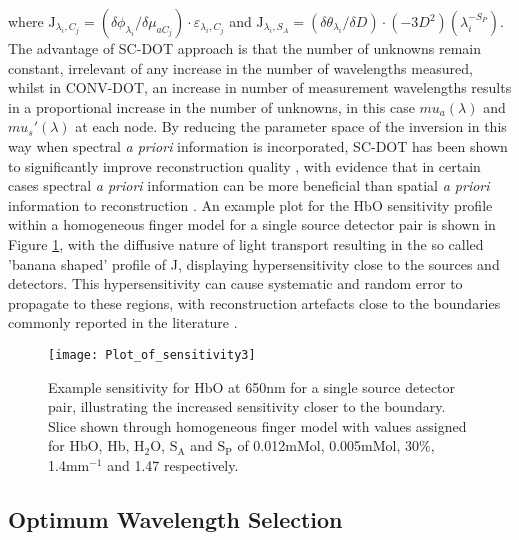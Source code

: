 \documentclass[twoside]{bhamthesis}
\theoremstyle{definition}
\begin{document}
where $\mathrm{J}_{\lambda_{i},C_{j}} = (\delta\phi_{\lambda_{i}}/\delta\mu_{aC_{j}})\cdot\varepsilon_{\lambda_{i},C_{j}}$ and $\mathrm{J}_{\lambda_{i},S_A} = (\delta\theta_{\lambda_{i}}/\delta D) \cdot (-3D^2)(\lambda_{i}^{-S_P})$. The advantage of SC-DOT approach is that the number of unknowns remain constant, irrelevant of any increase in the number of wavelengths measured, whilst in CONV-DOT, an increase in number of measurement wavelengths results in a proportional increase in the number of unknowns, in this case $mu_a(\lambda)$ and $mu_s'(\lambda)$ at each node. By reducing the parameter space of the inversion in this way when spectral \textit{a priori} information is incorporated, SC-DOT has been shown to significantly improve reconstruction quality \cite{srinivasan2005spectrally}, with evidence that in certain cases spectral \textit{a priori} information can be more beneficial than spatial \textit{a priori} information to reconstruction \cite{brooksby2005spectral}.
An example plot for the HbO sensitivity profile within a homogeneous finger model for a single source detector pair is shown in Figure \ref{fig:Sensitivity}, with the diffusive nature of light transport resulting in the so called 'banana shaped' profile of J, displaying hypersensitivity close to the sources and detectors. This hypersensitivity can cause systematic and random error to propagate to these regions, with reconstruction artefacts close to the boundaries commonly reported in the literature \cite{brooksby2005spectral,boas2001simultaneous}.

\begin{figure}[!ht]
  \centering
  \texttt{[image: Plot\_of\_sensitivity3]}
\caption{Example sensitivity for HbO at 650nm for a single source detector pair, illustrating the increased sensitivity closer to the boundary. Slice shown through homogeneous finger model with values assigned for HbO, Hb, $\mathrm{H_2O}$, $\mathrm{S_A}$ and $\mathrm{S_P}$ of 0.012mMol, 0.005mMol, 30\%, 1.4mm$^{-1}$ and 1.47 respectively.}
\label{fig:Sensitivity}
\end{figure}

\subsection{Optimum Wavelength Selection}
\label{Optimum_wavelength}
\end{document}
